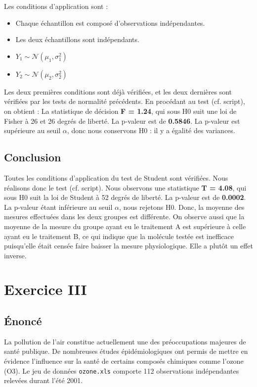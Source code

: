 \documentclass[12pt,a4paper]{article}
\begin{document}
	Les conditions d'application sont :
	\begin{itemize}
		\item Chaque échantillon est composé d'observations indépendantes.
		\item Les deux échantillons sont indépendants.
		\item $Y_1 \sim \mathcal{N}(\mu_1, \sigma_1^2)$
		\item $Y_2 \sim \mathcal{N}(\mu_2, \sigma_2^2)$
	\end{itemize}
	
	Les deux premières conditions sont déjà vérifiées, et les deux dernières sont vérifiées par les tests de normalité précédents. En procédant au test (cf. script), on obtient :
	La statistique de décision \textbf{F = 1.24}, qui sous H0 suit une loi de Fisher à 26 et 26 degrés de liberté. La p-valeur est de \textbf{0.5846}. La p-valeur est supérieure au seuil $\alpha$, donc nous conservons H0 : il y a égalité des variances.
	
	\subsection{Conclusion}
	Toutes les conditions d'application du test de Student sont vérifiées. Nous réalisons donc le test (cf. script). Nous observons une statistique \textbf{T = 4.08}, qui sous H0 suit la loi de Student à 52 degrés de liberté. La p-valeur est de \textbf{0.0002}. La p-valeur étant inférieure au seuil $\alpha$, nous rejetons H0. Donc, la moyenne des mesures effectuées dans les deux groupes est différente. On observe aussi que la moyenne de la mesure du groupe ayant eu le traitement A est supérieure à celle ayant eu le traitement B, ce qui indique que la molécule testée est inefficace puisqu'elle était censée faire baisser la mesure physiologique. Elle a plutôt un effet inverse.
	
\section{Exercice III}

\subsection{Énoncé}
La pollution de l’air constitue actuellement une des préoccupations majeures de santé publique. De nombreuses études épidémiologiques ont permis de mettre en évidence l’influence sur la santé de certains composés chimiques comme l’ozone (O3). Le jeu de données \texttt{ozone.xls} comporte 112 observations indépendantes relevées durant l’été 2001.
\end{document}
